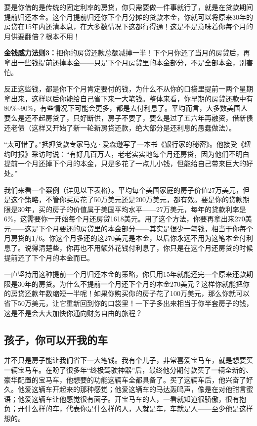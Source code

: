 要是你借的是传统的固定利率的房贷，你只需要做一件事就行了，就是在贷款期间提前归还本金。这个月提前归还你下个月分摊的贷款本金，你就可以将原来30年的房贷在15年内还清本息，在大多数情况下这都行得通！这是不是意味着你每个月的月供要翻倍？根本不用！

\textbf{金钱威力法则3：}把你的房贷还款总额减掉一半！下个月你还了当月的房贷后，再拿出一些钱提前还掉本金——只是下个月房贷里的本金部分，不是全部本金，别害怕。

反正这些钱，都是你下个月肯定要付的钱，为什么不从你的口袋里提前一两个星期拿出来，这样以后你能给自己省下来一大笔钱。整体来看，你早期的房贷还款中有80\%\textasciitilde{}90\%，有些情况下可能会更多，都是去付利息了。平均而言，大多数美国人要么是还不起房贷了，只好断供，房子不要了，要么是过了五六年再融资，借新债还老债（这样又开始了新一轮新房贷还款，绝大部分是还利息的愚蠢做法）。

“太可惜了。”抵押贷款专家马克·爱森逊写了一本书《银行家的秘密》。他接受《纽约时报》采访时说：“有好几百万人，老老实实地每个月还房贷，因为他们不明白提前一个月还掉下个月的本金，只是多花了一点儿小钱，但能给自己带来巨大的好处。”

我们来看一个案例（详见以下表格）。平均每个美国家庭的房子价值27万美元，但是这个策略，不管你买房花了50万美元还是200万美元，都有效。要是你的贷款期限是30年，买的房子的价值属于美国平均水平——27万美元，每年的贷款利率是6\%，这需要你一开始每个月还房贷1618美元。用了这个方法，你要再拿出来270美元——这是下个月要还的房贷里的本金部分——其实是很少一笔钱，相当于你每个月房贷的1/6。你这个月多还的这270美元是本金，以后你永远不用为这笔本金付利息了。说得清楚些，你再也不用额外花钱付利息了，你只是在这个月还房贷的时候提前还了下个月的本金而已。

一直坚持用这种提前一个月归还本金的策略，你只用15年就能还完一个原来还款期限是30年的房贷。为什么不提前一个月还下个月的本金270美元？这样你就能把你的房贷还款年数缩短一半呢！如果你购买你的房子花了100万美元，那么你就可以省下50万美元，让它重新回到你的口袋里！一下子多出来相当于你半套房子的钱，这是不是会大大加快你通向财务自由的旅程？



\subsection{孩子，你可以开我的车}

并不只是房子能让我们省下一大笔钱。我有个儿子，非常喜爱宝马车，就是想要买一辆宝马车。在盼了很多年“终极驾驶神器”后，最终他分期付款买了一辆全新的、豪华配置的宝马车，他想要的功能这辆车全都具备了。买了这辆车后，他兴奋了好久。他爱这辆车开起来的那种感觉；他爱这辆车的马达轰鸣声，像是在对他甜言蜜语；他爱这辆车让他感觉很有面子。开宝马车的人，一看就知道很骄傲，很有抱负；开什么样的车，代表你是什么样的人，人就是车，车就是人——至少他是这样想的。

